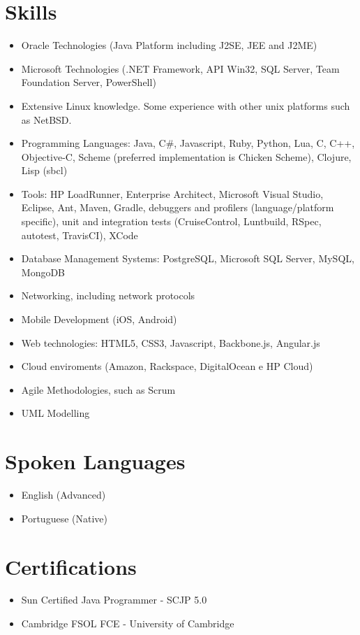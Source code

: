 \documentclass[letterpaper]{article}
\begin{document}
\section*{Skills}
\begin{itemize}
  \item Oracle Technologies (Java Platform including J2SE, JEE and J2ME)
  \item Microsoft Technologies (.NET Framework, API Win32, SQL Server, Team Foundation Server, PowerShell)
  \item Extensive Linux knowledge. Some experience with other unix platforms such as NetBSD.
  \item Programming Languages: Java, C\#, Javascript, Ruby, Python, Lua, C, C++, Objective-C, Scheme (preferred implementation is Chicken Scheme), Clojure, Lisp (sbcl)
  \item Tools: HP LoadRunner, Enterprise Architect, Microsoft
Visual Studio, Eclipse, Ant, Maven, Gradle, debuggers and profilers (language/platform specific),
unit and integration tests (CruiseControl, Luntbuild, RSpec, autotest, TravisCI), XCode
  \item Database Management Systems: PostgreSQL, Microsoft SQL Server, MySQL, MongoDB
  \item Networking, including network protocols
  \item Mobile Development (iOS, Android)
  \item Web technologies: HTML5, CSS3, Javascript, Backbone.js, Angular.js
  \item Cloud enviroments (Amazon, Rackspace, DigitalOcean e HP Cloud)
  \item Agile Methodologies, such as Scrum
  \item UML Modelling
\end{itemize}

\section*{Spoken Languages}
\begin{itemize}
  \item English (Advanced)
  \item Portuguese (Native)
\end{itemize}

\section*{Certifications}
\begin{itemize}
  \item Sun Certified Java Programmer - SCJP 5.0
  \item Cambridge FSOL FCE - University of Cambridge
\end{itemize}
\end{document}
